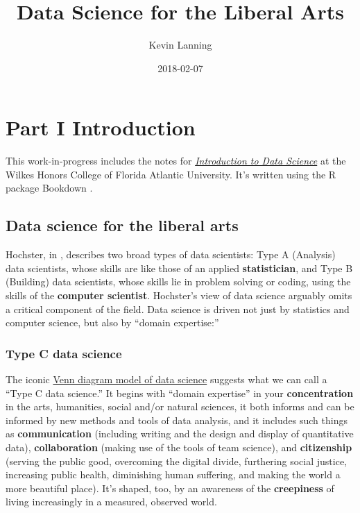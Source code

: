 \documentclass[]{book}
\title{Data Science for the Liberal Arts}
\author{Kevin Lanning}
\date{2018-02-07}
\theoremstyle{definition}
\theoremstyle{definition}
\theoremstyle{definition}
\theoremstyle{remark}
\begin{document}
\maketitle

{
\setcounter{tocdepth}{1}
\tableofcontents
}
\part{Part I Introduction}\label{part-part-i-introduction}

This work-in-progress includes the notes for
\href{https://kevinlanning.github.io/DataSciSpring2018/}{\emph{\emph{Introduction
to Data Science}}} at the Wilkes Honors College of Florida Atlantic
University. It's written using the R package Bookdown
\citep{R-bookdown}.

\chapter{Data science for the liberal
arts}\label{data-science-for-the-liberal-arts}

Hochster, in \citet{hicks2017guide}, describes two broad types of data
scientists: Type A (Analysis) data scientists, whose skills are like
those of an applied \textbf{statistician}, and Type B (Building) data
scientists, whose skills lie in problem solving or coding, using the
skills of the \textbf{computer scientist}. Hochster's view of data
science arguably omits a critical component of the field. Data science
is driven not just by statistics and computer science, but also by
``domain expertise:''

\section{Type C data science}\label{type-c-data-science}

The iconic
\href{https://www.google.com/search?q=venn+diagram+model+of+data+science\&newwindow=1\&safe=active\&rlz=1C1CHBF_enUS762US763\&tbm=isch\&tbo=u\&source=univ\&sa=X\&ved=0ahUKEwiM_abBtY7XAhXDQCYKHdgyB58QsAQIOg\&biw=1378}{Venn
diagram model of data science} suggests what we can call a ``Type C data
science.'' It begins with ``domain expertise'' in your
\textbf{concentration} in the arts, humanities, social and/or natural
sciences, it both informs and can be informed by new methods and tools
of data analysis, and it includes such things as \textbf{communication}
(including writing and the design and display of quantitative data),
\textbf{collaboration} (making use of the tools of team science), and
\textbf{citizenship} (serving the public good, overcoming the digital
divide, furthering social justice, increasing public health, diminishing
human suffering, and making the world a more beautiful place). It's
shaped, too, by an awareness of the \textbf{creepiness} of living
increasingly in a measured, observed world.
\end{document}
